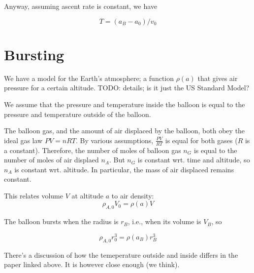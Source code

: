\documentclass{article}
\begin{document}
Anyway, assuming ascent rate is constant, we have

\[  T = (a_B - a_0) / v_0 \]

\section{Bursting}

We have a model for the Earth's atmosphere; a function $\rho(a)$ that gives
air pressure for a certain altitude.
TODO: details; is it just the US Standard Model?

We assume that the pressure and temperature inside the balloon is equal
to the pressure and temperature outside of the balloon.

The balloon gas, and the amount of air displaced by the balloon, both
obey the ideal gas law $PV=nRT$. By various assumptions, $\frac{PV}{RT}$ is
equal for both gases ($R$ is a constant).
Therefore, the number of moles of balloon gas $n_G$ is equal to the number
of moles of air displaed $n_A$. But $n_G$ is constant wrt. time and altitude,
so $n_A$ is constant wrt. altitude. In particular, the mass of air displaced
remains constant.

This relates volume $V$ at altitude $a$ to air density: 
\[
    \rho_{A,0} V_0 = \rho(a) V
\]

The balloon bursts when the radius is $r_B$, i.e., when its volume is $V_B$, so

\[
    \rho_{A,0} r_0^3 = \rho(a_B) r_B^3
\]

There's a discussion of how the temeperature outside and inside differs in
the paper linked above. It is however close enough (we think).
\end{document}
